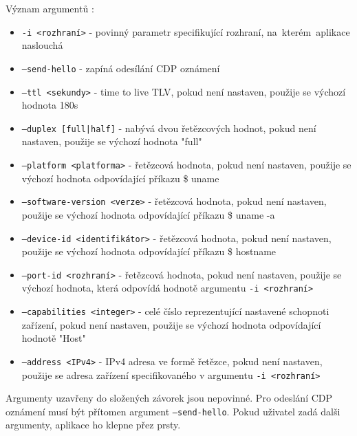\documentclass[a4paper,12pt]{article}
\begin{document}
		Význam argumentů \cite{wis:zadani}: 
		\begin{itemize}
			\item \texttt{-i <rozhraní>} - povinný parametr specifikující rozhraní, na~kterém~aplikace naslouchá
			\item \texttt{--send-hello} - zapíná odesílání CDP oznámení
			\item \texttt{--ttl <sekundy>} - time to live TLV, pokud není nastaven, použije se výchozí hodnota 180s
			\item \texttt{--duplex [full|half]} - nabývá dvou řetězcových hodnot, pokud není nastaven, použije se výchozí hodnota "full"
			\item \texttt{--platform <platforma>} - řetězcová hodnota, pokud není nastaven, použije se výchozí hodnota odpovídající příkazu \$ uname
			\item \texttt{--software-version <verze>} - řetězcová hodnota, pokud není nastaven, použije se výchozí hodnota odpovídající příkazu \$ uname -a
			\item \texttt{--device-id <identifikátor>} - řetězcová hodnota, pokud není nastaven, použije se výchozí hodnota odpovídající příkazu \$ hostname
			\item \texttt{--port-id <rozhraní>} - řetězcová hodnota, pokud není nastaven, použije se výchozí hodnota, která odpovídá hodnotě argumentu \texttt{-i <rozhraní>}
			\item \texttt{--capabilities <integer>} - celé číslo reprezentující nastavené schopnoti zařízení, pokud není nastaven, použije se výchozí hodnota odpovídající hodnotě "Host"
			\item \texttt{--address <IPv4>} - IPv4 adresa ve formě řetězce, pokud není nastaven, použije se adresa zařízení specifikovaného v argumentu \texttt{-i <rozhraní>}  
		\end{itemize}
		
		Argumenty uzavřeny do složených závorek jsou nepovinné. Pro odeslání CDP oznámení musí být přítomen argument \texttt{--send-hello}. Pokud uživatel zadá dalši argumenty, aplikace ho klepne přez prsty.
			
	\pagebreak	
	\listoffigures
	\listoftables
	\pagebreak

	
	
\end{document}
